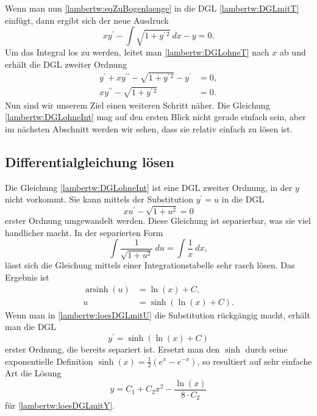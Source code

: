 Wenn man nun \eqref{lambertw:eqZuBogenlaenge} in die DGL \eqref{lambertw:DGLmitT} einfügt, dann ergibt sich der neue Ausdruck
\begin{equation}
	x y^{\prime} - \int\sqrt{1+y^{\prime\, 2}} \: dx - y
	= 0.
	\label{lambertw:DGLohneT}
\end{equation}
Um das Integral los zu werden, leitet man \eqref{lambertw:DGLohneT} nach \(x\) ab und erhält die DGL zweiter Ordnung 
\begin{align}
	y^{\prime}+ xy^{\prime\prime} - \sqrt{1+y^{\prime\, 2}} - y^{\prime}
	&= 0, \\
	xy^{\prime\prime} - \sqrt{1+y^{\prime\, 2}}
	&= 0.
	\label{lambertw:DGLohneInt}
\end{align}
Nun sind wir unserem Ziel einen weiteren Schritt näher. Die Gleichung \eqref{lambertw:DGLohneInt} mag auf den ersten Blick nicht gerade einfach sein, aber im nächsten Abschnitt werden wir sehen, dass sie relativ einfach zu lösen ist.

\subsection{Differentialgleichung lösen
	\label{lambertw:subsection:DGLloes}}
Die Gleichung \eqref{lambertw:DGLohneInt} ist eine DGL zweiter Ordnung, in der \(y\) nicht vorkommt. Sie kann mittels der Substitution \(y^{\prime} = u\) in die DGL
\begin{equation}
	xu^{\prime} - \sqrt{1+u^2}
	= 0
	\label{lambertw:DGLmitU}
\end{equation}
erster Ordnung umgewandelt werden.
Diese Gleichung ist separierbar, was sie viel handlicher macht. In der separierten Form
\begin{equation}
	\int{\frac{1}{\sqrt{1+u^2}}\:du} 
	= 
	\int{\frac{1}{x}\:dx},
\end{equation}
lässt sich die Gleichung mittels einer Integrationstabelle sehr rasch lösen. 
Das Ergebnis ist 
\begin{align}
	\operatorname{arsinh}(u)
	&=
	\operatorname{ln}(x) + C, \\
	u
	&=
	\operatorname{sinh}(\operatorname{ln}(x) + C).
	\label{lambertw:loesDGLmitU}
\end{align}
Wenn man in \eqref{lambertw:loesDGLmitU} die Substitution rückgängig macht, erhält man die DGL 
\begin{equation}
	y^{\prime}
	=
	\operatorname{sinh}(\operatorname{ln}(x) + C)
	\label{lambertw:loesDGLmitY}
\end{equation}
erster Ordnung, die bereits separiert ist.
Ersetzt man den \(\operatorname{sinh}\) durch seine exponentielle Definition \(\operatorname{sinh}(x)=\frac{1}{2}(e^x-e^{-x})\), so resultiert auf sehr einfache Art die Lösung 
\begin{equation}
	y
	=
	C_1 + C_2 x^2 - \frac{\operatorname{ln}(x)}{8 \cdot C_2}
\end{equation}
für \eqref{lambertw:loesDGLmitY}.

